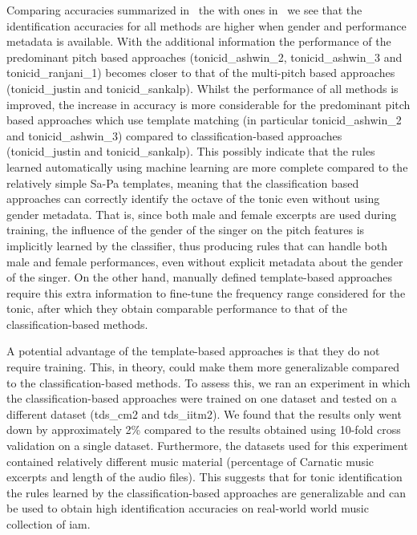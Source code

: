 {Comparing accuracies summarized in~ the with ones in~ we see that the identification accuracies for all methods are higher when gender and performance metadata is available. With the additional information the performance of the predominant pitch based approaches (\acrshort{tonicid_ashwin_2}, \acrshort{tonicid_ashwin_3} and \acrshort{tonicid_ranjani_1}) becomes closer to that of the multi-pitch based approaches (\acrshort{tonicid_justin} and \acrshort{tonicid_sankalp}). Whilst the performance of all methods is improved, the increase in accuracy is more considerable for the predominant pitch based approaches which use template matching (in particular \acrshort{tonicid_ashwin_2} and \acrshort{tonicid_ashwin_3}) compared to classification-based approaches (\acrshort{tonicid_justin} and \acrshort{tonicid_sankalp}). This possibly indicate that the rules learned automatically using machine learning are more complete compared to the relatively simple Sa-Pa templates, meaning that the classification based approaches can correctly identify the octave of the tonic even without using gender metadata. That is, since both male and female excerpts are used during training, the influence of the gender of the singer on the pitch features is implicitly learned by the classifier, thus producing rules that can handle both male and female performances, even without explicit metadata about the gender of the singer. On the other hand, manually defined template-based approaches require this extra information to fine-tune the frequency range
considered for the tonic, after which they obtain comparable performance to that of the classification-based methods.

A potential advantage of the template-based approaches is that they do not require training. This, in theory, could make them more generalizable compared
to the classification-based methods. To assess this, we ran an experiment in which the classification-based approaches were trained on one dataset and tested on a different dataset (\acrshort{tds_cm2} and \acrshort{tds_iitm2}). We found that the results only went down by approximately 2\% compared to the results obtained using 10-fold cross validation on a single dataset. Furthermore, the datasets used for this experiment contained relatively different music material (percentage of Carnatic music excerpts and length of the audio files). This suggests that for tonic identification the rules learned by the classification-based approaches are generalizable and can be used to obtain high identification accuracies on real-world world music collection of \gls{iam}.


}
